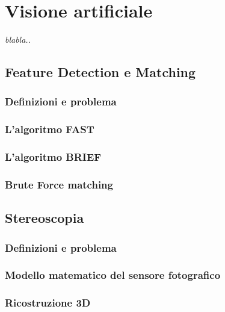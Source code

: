 \chapter{Visione artificiale}
\label{chap:visione}

\begin{minipage}{12cm}\textit{blabla..}
\end{minipage}

\vspace*{1cm}



\section{Feature Detection e Matching}
\label{sec:feature}

\subsection{Definizioni e problema}
\label{sec:det:def}


\subsection{L'algoritmo FAST}
\label{sec:det:fast}

\subsection{L'algoritmo BRIEF}
\label{sec:det:brief}

\subsection{Brute Force matching}
\label{sec:det:bmmatch}


\section{Stereoscopia}
\label{sec:stereo}


\subsection{Definizioni e problema}
\label{sec:stereo:def}


\subsection{Modello matematico del sensore fotografico}
\label{sec:stereo:modello}


\subsection{Ricostruzione 3D}
\label{sec:stereo:ric3d}





